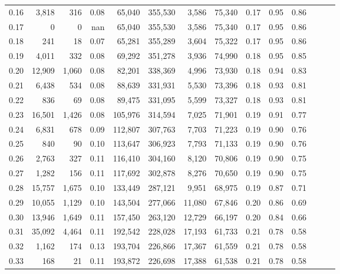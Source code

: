 \begin{tabular}{rrrrrrrrrrrrrr}
0.16 &   3,818 &    316 &  0.08 &   65,040 &  355,530 &   3,586 &  75,340 &  0.17 &  0.95 &      0.86 \\
0.17 &       0 &      0 &   nan &   65,040 &  355,530 &   3,586 &  75,340 &  0.17 &  0.95 &      0.86 \\
0.18 &     241 &     18 &  0.07 &   65,281 &  355,289 &   3,604 &  75,322 &  0.17 &  0.95 &      0.86 \\
0.19 &   4,011 &    332 &  0.08 &   69,292 &  351,278 &   3,936 &  74,990 &  0.18 &  0.95 &      0.85 \\
0.20 &  12,909 &  1,060 &  0.08 &   82,201 &  338,369 &   4,996 &  73,930 &  0.18 &  0.94 &      0.83 \\
0.21 &   6,438 &    534 &  0.08 &   88,639 &  331,931 &   5,530 &  73,396 &  0.18 &  0.93 &      0.81 \\
0.22 &     836 &     69 &  0.08 &   89,475 &  331,095 &   5,599 &  73,327 &  0.18 &  0.93 &      0.81 \\
0.23 &  16,501 &  1,426 &  0.08 &  105,976 &  314,594 &   7,025 &  71,901 &  0.19 &  0.91 &      0.77 \\
0.24 &   6,831 &    678 &  0.09 &  112,807 &  307,763 &   7,703 &  71,223 &  0.19 &  0.90 &      0.76 \\
0.25 &     840 &     90 &  0.10 &  113,647 &  306,923 &   7,793 &  71,133 &  0.19 &  0.90 &      0.76 \\
0.26 &   2,763 &    327 &  0.11 &  116,410 &  304,160 &   8,120 &  70,806 &  0.19 &  0.90 &      0.75 \\
0.27 &   1,282 &    156 &  0.11 &  117,692 &  302,878 &   8,276 &  70,650 &  0.19 &  0.90 &      0.75 \\
0.28 &  15,757 &  1,675 &  0.10 &  133,449 &  287,121 &   9,951 &  68,975 &  0.19 &  0.87 &      0.71 \\
0.29 &  10,055 &  1,129 &  0.10 &  143,504 &  277,066 &  11,080 &  67,846 &  0.20 &  0.86 &      0.69 \\
0.30 &  13,946 &  1,649 &  0.11 &  157,450 &  263,120 &  12,729 &  66,197 &  0.20 &  0.84 &      0.66 \\
0.31 &  35,092 &  4,464 &  0.11 &  192,542 &  228,028 &  17,193 &  61,733 &  0.21 &  0.78 &      0.58 \\
0.32 &   1,162 &    174 &  0.13 &  193,704 &  226,866 &  17,367 &  61,559 &  0.21 &  0.78 &      0.58 \\
0.33 &     168 &     21 &  0.11 &  193,872 &  226,698 &  17,388 &  61,538 &  0.21 &  0.78 &      0.58 \\

\end{tabular}
